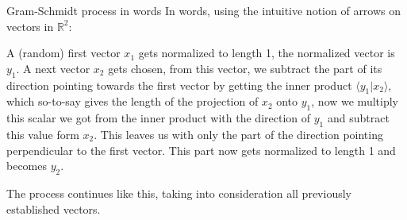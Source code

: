 \documentclass{beamer}
\begin{document}
\begin{frame}{Gram-Schmidt process in words}
    In words, using the intuitive notion of arrows on vectors in $\mathbb{R}^2$:\par
    A (random) first vector $x_1$ gets normalized to length 1, the normalized vector is $y_1$. A next vector $x_2$ gets chosen, from this vector, we subtract the part of its direction pointing towards the first vector by getting the inner product $\langle y_1 | x_2 \rangle$, which so-to-say gives the length of the projection of $x_2$ onto $y_1$, now we multiply this scalar we got from the inner product with the direction of $y_1$ and subtract this value form $x_2$. This leaves us with only the part of the direction pointing perpendicular to the first vector. This part now gets normalized to length 1 and becomes $y_2$.\par
    The process continues like this, taking into consideration all previously established vectors.
\end{frame}
\end{document}
